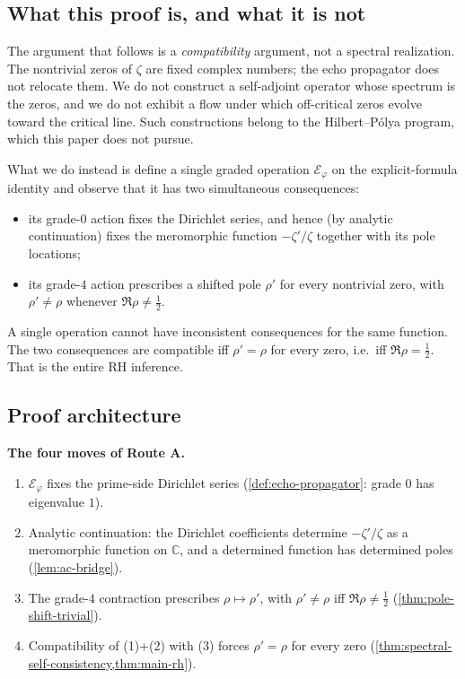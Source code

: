 \documentclass[11pt,a4paper]{article}
\theoremstyle{plain}
\theoremstyle{definition}
\theoremstyle{remark}
\numberwithin{equation}{section}
\providecommand{\vp}{\varphi}
\providecommand{\half}{\tfrac{1}{2}}
\providecommand{\EF}{\mathcal{E}}
\begin{document}
\subsection{What this proof is, and what it is not}

The argument that follows is a \emph{compatibility} argument, not
a spectral realization.  The nontrivial zeros of $\zeta$ are
fixed complex numbers; the echo propagator does not relocate
them.  We do not construct a self-adjoint operator whose spectrum
is the zeros, and we do not exhibit a flow under which off-critical
zeros evolve toward the critical line.  Such constructions belong
to the Hilbert--P\'olya program, which this paper does not
pursue.

What we do instead is define a single graded operation $\EF_\vp$ on
the explicit-formula identity and observe that it has two
simultaneous consequences:
\begin{itemize}
  \item its grade-$0$ action fixes the Dirichlet series, and hence
    (by analytic continuation) fixes the meromorphic function
    $-\zeta'/\zeta$ together with its pole locations;
  \item its grade-$4$ action prescribes a shifted pole $\rho'$ for
    every nontrivial zero, with $\rho' \ne \rho$ whenever
    $\Re\rho \ne \half$.
\end{itemize}
A single operation cannot have inconsistent consequences for the
same function.  The two consequences are compatible iff
$\rho' = \rho$ for every zero, i.e.\ iff $\Re\rho = \half$.  That
is the entire RH inference.

\subsection{Proof architecture}

\begin{keyresultbox}
\noindent\textbf{The four moves of Route A.}
\begin{enumerate}
  \item $\EF_\vp$ fixes the prime-side Dirichlet series
    (\cref{def:echo-propagator}: grade $0$ has eigenvalue $1$).
  \item Analytic continuation: the Dirichlet coefficients
    determine $-\zeta'/\zeta$ as a meromorphic function on
    $\mathbb{C}$, and a determined function has determined poles
    (\cref{lem:ac-bridge}).
  \item The grade-$4$ contraction prescribes
    $\rho \mapsto \rho'$, with $\rho' \ne \rho$ iff
    $\Re\rho \ne \half$ (\cref{thm:pole-shift-trivial}).
  \item Compatibility of (1)+(2) with (3) forces $\rho' = \rho$
    for every zero
    (\cref{thm:spectral-self-consistency,thm:main-rh}).
\end{enumerate}
\end{keyresultbox}
\end{document}
